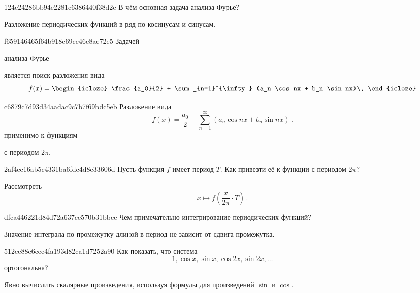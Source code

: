 \begin{note}{124c24286bb94e2281c6386440f38d2c}
    В чём основная задача анализа Фурье?

    \begin{cloze}{1}
        Разложение периодических функций в ряд по косинусам и синусам.
    \end{cloze}
\end{note}

\begin{note}{f659146465f64b918c69ce46c8ae72e5}
    Задачей \begin{icloze}{2}анализа Фурье\end{icloze} является поиск разложения вида
    \[
        f(x) = \begin{icloze}{1}\frac{a_0}{2} + \sum_{n=1}^{\infty} (a_n \cos nx + b_n \sin nx)\,.\end{icloze}
    \]
\end{note}

\begin{note}{c6879c7d93d34aadac9c7b7f69bdc5eb}
    Разложение вида
    \[
        f(x) = \frac{a_0}{2} + \sum_{n=1}^{\infty} (a_n \cos nx + b_n \sin nx)\,.
    \]
    применимо к функциям \begin{icloze}{1}с периодом \({ 2\pi }\).\end{icloze}
\end{note}

\begin{note}{2af4cc16ab5c4331ba6fdc4d8e33606d}
    Пусть функция \({ f }\) имеет период \({ T }\).
    Как привезти её к функции с периодом \({ 2\pi }\)?

    \begin{cloze}{1}
        Рассмотреть
        \[
            x \mapsto f\left( \frac{x}{2\pi} \cdot T \right)\,.
        \]
    \end{cloze}
\end{note}

\begin{note}{dfca446221d84d72a637ce570b31bbce}
    Чем примечательно интегрирование периодических функций?

    \begin{cloze}{1}
        Значение интеграла по промежутку длиной в период не зависит от сдвига промежутка.
    \end{cloze}
\end{note}

\begin{note}{512ee88e6cec4fa193d82ca1d7252a90}
    Как показать, что система
    \[
        1, \cos x, \sin x, \cos 2x, \sin 2x, \ldots
    \]
    ортогональна?

    \begin{cloze}{1}
        Явно вычислить скалярные произведения, используя формулы для произведений \({ \sin }\) и \({ \cos }\).
    \end{cloze}
\end{note}

